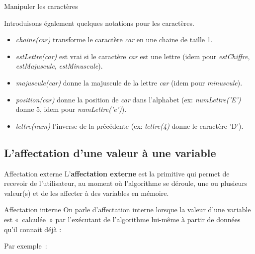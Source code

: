 \begin{frame}{Manipuler les caractères}

		Introduisons également quelques notations pour les caractères.

		\begin{itemize}
		\item \textit{chaine(car)} transforme le caractère \textit{car} en une chaine de taille 1.
		\item \textit{estLettre(car)} est vrai si le caractère \textit{car} est une lettre
			(idem pour \textit{estChiffre}, 
			\textit{estMajuscule}, 
			\textit{estMinuscule}).
		\item \textit{majuscule(car)} donne la majuscule de la lettre \textit{car}
			(idem pour \textit{minuscule}).
		\item \textit{position(car)} donne la position de \textit{car} dans l'alphabet (ex: \textit{numLettre('E')} donne 5, 
		idem pour \textit{numLettre('e')}).
		\item \textit{lettre(num)} l'inverse de la précédente (ex: \textit{lettre(4)} donne le caractère 'D').
	\end{itemize}
\end{frame}

\subsection{L’affectation d’une valeur à une variable}
\begin{frame}{Affectation externe}
	L’\textbf{affectation externe} est la primitive qui permet de recevoir de
	l’utilisateur, au moment où l'algorithme se déroule,
	une ou plusieurs valeur(s) et de les affecter à des variables en
	mémoire.

	\bigskip
	
\end{frame}

\begin{frame}{Affectation interne }
	On parle d’affectation interne lorsque la valeur d’une variable est
	«~calculée~» par l’exécutant de l’algorithme lui-même à partir de
	données qu’il connait déjà :

	\bigskip
	
	
	Par exemple~:

\end{frame}

